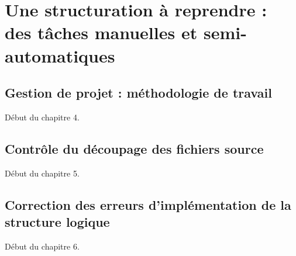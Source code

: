 \part{Une structuration à reprendre : des tâches manuelles et semi-automatiques}

\clearpage
\thispagestyle{empty}
\cleardoublepage

\chapter{Gestion de projet : méthodologie de travail}

Début du chapitre 4.

\chapter{Contrôle du découpage des fichiers source}

Début du chapitre 5.

\chapter[Correction des erreurs d'implémentation]{Correction des erreurs d'implémentation de la structure logique}

Début du chapitre 6.